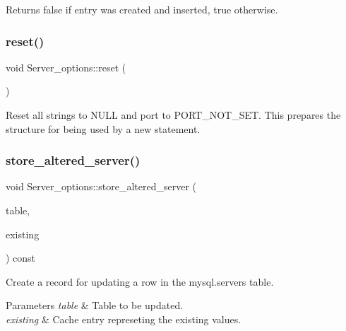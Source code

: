 \begin{DoxyReturn}{Returns}
false if entry was created and inserted, true otherwise. 
\end{DoxyReturn}
\mbox{\label{classServer__options_a765d3430cf5d1a93ce0fa0615929d7e1}} 
\subsubsection{\texorpdfstring{reset()}{reset()}}
{\footnotesize\ttfamily void Server\+\_\+options\+::reset (\begin{DoxyParamCaption}\item[{void}]{ }\end{DoxyParamCaption})}

Reset all strings to N\+U\+LL and port to P\+O\+R\+T\+\_\+\+N\+O\+T\+\_\+\+S\+ET. This prepares the structure for being used by a new statement. \mbox{\label{classServer__options_aa2239295874852d1ebc01c933223029c}} 
\subsubsection{\texorpdfstring{store\+\_\+altered\+\_\+server()}{store\_altered\_server()}}
{\footnotesize\ttfamily void Server\+\_\+options\+::store\+\_\+altered\+\_\+server (\begin{DoxyParamCaption}\item[{\mbox{\hyperlink{structTABLE}{T\+A\+B\+LE}} $\ast$}]{table,  }\item[{\mbox{\hyperlink{classFOREIGN__SERVER}{F\+O\+R\+E\+I\+G\+N\+\_\+\+S\+E\+R\+V\+ER}} $\ast$}]{existing }\end{DoxyParamCaption}) const}

Create a record for updating a row in the mysql.\+servers table.


\begin{DoxyParams}{Parameters}
{\em table} & Table to be updated. \\
\hline
{\em existing} & Cache entry represeting the existing values. \\
\hline
\end{DoxyParams}
\mbox{\label{classServer__options_a2a05ad0d0331757155132cb6b02cb00d}} 
